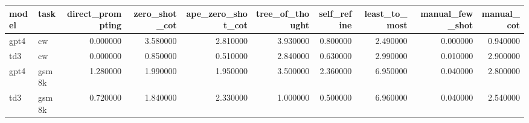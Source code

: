 \begin{tabular}{llrrrrrrrr}
\toprule
model & task & direct_prompting & zero_shot_cot & ape_zero_shot_cot & tree_of_thought & self_refine & least_to_most & manual_few_shot & manual_cot \\
\midrule
gpt4 & cw & 0.000000 & 3.580000 & 2.810000 & 3.930000 & 0.800000 & 2.490000 & 0.000000 & 0.940000 \\
td3 & cw & 0.000000 & 0.850000 & 0.510000 & 2.840000 & 0.630000 & 2.990000 & 0.010000 & 2.900000 \\
gpt4 & gsm8k & 1.280000 & 1.990000 & 1.950000 & 3.500000 & 2.360000 & 6.950000 & 0.040000 & 2.800000 \\
td3 & gsm8k & 0.720000 & 1.840000 & 2.330000 & 1.000000 & 0.500000 & 6.960000 & 0.040000 & 2.540000 \\
\bottomrule
\end{tabular}
